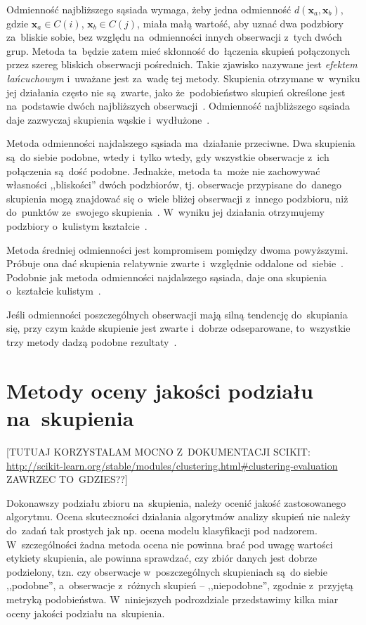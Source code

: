 \documentclass{praca1}
\begin{document}
Odmienność najbliższego sąsiada wymaga, żeby jedna odmienność $d(\mathbf{x}_a, \mathbf{x}_b)$, gdzie $\mathbf{x}_a \in C(i)$, $\mathbf{x}_b \in C(j)$, miała małą wartość, aby uznać dwa podzbiory za~bliskie sobie, bez względu na~odmienności innych obserwacji z~tych dwóch grup. Metoda ta~będzie zatem mieć skłonność do~łączenia skupień połączonych przez szereg bliskich obserwacji pośrednich. Takie zjawisko nazywane jest \emph{efektem łańcuchowym} i~uważane jest za~wadę tej metody. Skupienia otrzymane w~wyniku jej działania często nie są~zwarte, jako że~podobieństwo skupień określone jest na~podstawie dwóch najbliższych obserwacji~\cite{Hastie2009:elements}. Odmienność najbliższego sąsiada daje zazwyczaj skupienia wąskie i~wydłużone~\cite{Koronacki2005:statystyczne}. 

Metoda odmienności najdalszego sąsiada ma~działanie przeciwne. Dwa skupienia są~do siebie podobne, wtedy i~tylko wtedy, gdy wszystkie obserwacje z~ich połączenia są~dość podobne. Jednakże, metoda ta~może nie zachowywać własności ,,bliskości'' dwóch podzbiorów, tj. obserwacje przypisane do~danego skupienia mogą znajdować się o~wiele bliżej obserwacji z~innego podzbioru, niż do~punktów ze~swojego skupienia~\cite{Hastie2009:elements}. W~wyniku jej działania otrzymujemy podzbiory o~kulistym kształcie~\cite{Koronacki2005:statystyczne}.

Metoda średniej odmienności jest kompromisem pomiędzy dwoma powyższymi. Próbuje ona dać skupienia relatywnie zwarte i~względnie oddalone od~siebie~\cite{Hastie2009:elements}. Podobnie jak metoda odmienności najdalszego sąsiada, daje ona skupienia o~kształcie kulistym~\cite{Koronacki2005:statystyczne}.

Jeśli odmienności poszczególnych obserwacji mają silną tendencję do~skupiania się, przy czym każde skupienie jest zwarte i~dobrze odseparowane, to~wszystkie trzy metody dadzą podobne rezultaty~\cite{Hastie2009:elements}.

\section{Metody oceny jakości podziału na~skupienia}

[TUTUAJ KORZYSTALAM MOCNO Z~DOKUMENTACJI SCIKIT: \url{http://scikit-learn.org/stable/modules/clustering.html#clustering-evaluation}  ZAWRZEC TO~GDZIES??]

Dokonawszy podziału zbioru na~skupienia, należy ocenić jakość zastosowanego algorytmu. Ocena skuteczności działania algorytmów analizy skupień nie należy do~zadań tak prostych jak np. ocena modelu klasyfikacji pod nadzorem. W~szczególności żadna metoda ocena nie powinna brać pod uwagę wartości etykiety skupienia, ale powinna sprawdzać, czy zbiór danych jest dobrze podzielony, tzn. czy obserwacje w~poszczególnych skupieniach są~do siebie ,,podobne'', a~obserwacje z~różnych skupień -- ,,niepodobne'', zgodnie z~przyjętą metryką podobieństwa. W~niniejszych podrozdziale przedstawimy kilka miar oceny jakości podziału na~skupienia.
\end{document}
